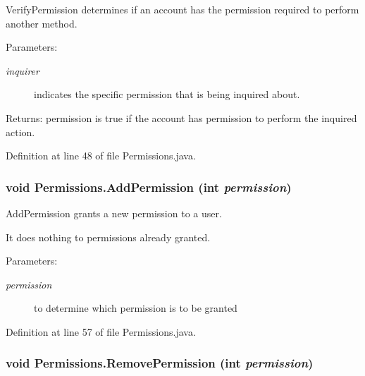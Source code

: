 VerifyPermission determines if an account has the permission required to perform another method. 

\begin{Desc}
\item[Parameters:]
\begin{description}
\item[{\em inquirer}]indicates the specific permission that is being inquired about. \end{description}
\end{Desc}
\begin{Desc}
\item[Returns:]permission is true if the account has permission to perform the inquired action. \end{Desc}


Definition at line 48 of file Permissions.java.\hypertarget{classPermissions_8a87919d26aa22c5c5d91cf6e92dba9d}{
\subsubsection{\setlength{\rightskip}{0pt plus 5cm}void Permissions.AddPermission (int {\em permission})}}
\label{classPermissions_8a87919d26aa22c5c5d91cf6e92dba9d}


AddPermission grants a new permission to a user. 

It does nothing to permissions already granted. \begin{Desc}
\item[Parameters:]
\begin{description}
\item[{\em permission}]to determine which permission is to be granted \end{description}
\end{Desc}


Definition at line 57 of file Permissions.java.\hypertarget{classPermissions_59b642c9487b1941f2977c830b18ee71}{
\subsubsection{\setlength{\rightskip}{0pt plus 5cm}void Permissions.RemovePermission (int {\em permission})}}
\label{classPermissions_59b642c9487b1941f2977c830b18ee71}


